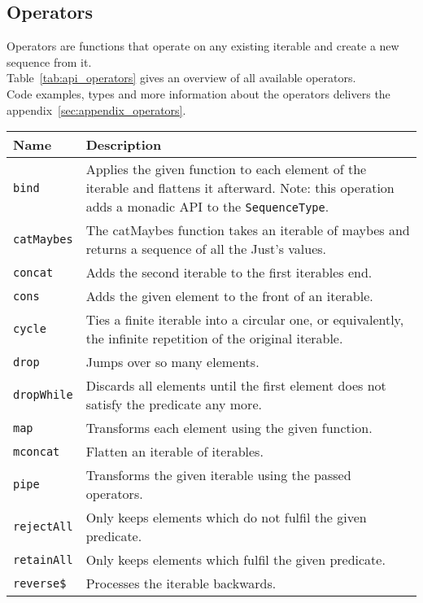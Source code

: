 \subsection{Operators} %
\label{sub:api_Operators}
Operators are functions that operate on any existing iterable and create a
new sequence from it. \\
Table~\ref{tab:api_operators} gives an overview of all available operators.\\
Code examples, types and more information about the operators delivers the
appendix~\ref{sec:appendix_operators}.
\begin{table}[H]
  \centering
  \begin{tabularx}{\textwidth}{| l | X |} \hline
    \textbf{Name} & \textbf{Description} \\ \hline
    \texttt{bind} & Applies the given function to each element of the iterable and flattens it afterward. Note: this operation adds a monadic API to the \texttt{SequenceType}. \\ \hline 
    \texttt{catMaybes} & The catMaybes function takes an iterable of maybes and returns a sequence of all the Just's values. \\ \hline 
    \texttt{concat} & Adds the second iterable to the first iterables end. \\ \hline 
    \texttt{cons} & Adds the given element to the front of an iterable. \\ \hline 
    \texttt{cycle} & Ties a finite iterable into a circular one, or equivalently, the infinite repetition of the original iterable. \\ \hline 
    \texttt{drop} & Jumps over so many elements. \\ \hline 
    \texttt{dropWhile} & Discards all elements until the first element does not satisfy the predicate any more. \\ \hline 
    \texttt{map} & Transforms each element using the given function. \\ \hline 
    \texttt{mconcat} & Flatten an iterable of iterables. \\ \hline 
    \texttt{pipe} & Transforms the given iterable using the passed operators. \\ \hline 
    \texttt{rejectAll} & Only keeps elements which do not fulfil the given predicate. \\ \hline 
    \texttt{retainAll} & Only keeps elements which fulfil the given predicate. \\ \hline 
    \texttt{reverse\$} & Processes the iterable backwards. \\ \hline 

\end{tabularx}
\end{table}
